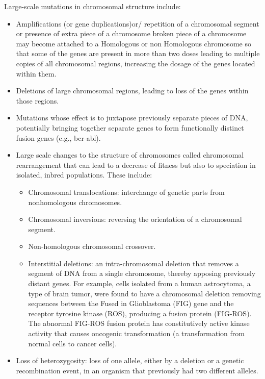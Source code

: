 Large-scale mutations in chromosomal structure include:

\begin{itemize}
\tightlist
\item
  Amplifications (or gene duplications)or/ repetition of a chromosomal segment or presence of extra piece of a chromosome broken piece of a chromosome may become attached to a Homologous or non Homologous chromosome so that some of the genes are present in more than two doses leading to multiple copies of all chromosomal regions, increasing the dosage of the genes located within them.
\item
  Deletions of large chromosomal regions, leading to loss of the genes within those regions.
\item
  Mutations whose effect is to juxtapose previously separate pieces of DNA, potentially bringing together separate genes to form functionally distinct fusion genes (e.g., bcr-abl).
\item
  Large scale changes to the structure of chromosomes called chromosomal rearrangement that can lead to a decrease of fitness but also to speciation in isolated, inbred populations. These include:

  \begin{itemize}
  \tightlist
  \item
    Chromosomal translocations: interchange of genetic parts from nonhomologous chromosomes.
  \item
    Chromosomal inversions: reversing the orientation of a chromosomal segment.
  \item
    Non-homologous chromosomal crossover.
  \item
    Interstitial deletions: an intra-chromosomal deletion that removes a segment of DNA from a single chromosome, thereby apposing previously distant genes. For example, cells isolated from a human astrocytoma, a type of brain tumor, were found to have a chromosomal deletion removing sequences between the Fused in Glioblastoma (FIG) gene and the receptor tyrosine kinase (ROS), producing a fusion protein (FIG-ROS). The abnormal FIG-ROS fusion protein has constitutively active kinase activity that causes oncogenic transformation (a transformation from normal cells to cancer cells).
  \end{itemize}
\item
  Loss of heterozygosity: loss of one allele, either by a deletion or a genetic recombination event, in an organism that previously had two different alleles.
\end{itemize}

